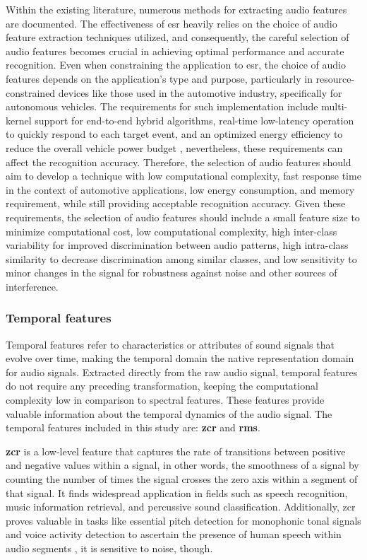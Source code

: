 Within the existing literature, numerous methods for extracting audio features are documented. The effectiveness of \gls{esr} heavily relies on the choice of audio feature extraction techniques utilized, and consequently, the careful selection of audio features becomes crucial in achieving optimal performance and accurate recognition. Even when constraining the application to \gls{esr}, the choice of audio features depends on the application’s type and purpose, particularly in resource-constrained devices like those used in the automotive industry, specifically for autonomous vehicles. The requirements for such implementation include multi-kernel support for end-to-end hybrid algorithms, real-time low-latency operation to quickly respond to each target event, and an optimized energy efficiency to reduce the overall vehicle power budget \cite{Yin2023}, nevertheless, these requirements can affect the recognition accuracy. Therefore, the selection of audio features should aim to develop a technique with low computational complexity, fast response time in the context of automotive applications, low energy consumption, and memory requirement, while still providing acceptable recognition accuracy. Given these requirements, the selection of audio features should include a small feature size to minimize computational cost, low computational complexity, high inter-class variability for improved discrimination between audio patterns, high intra-class similarity to decrease discrimination among similar classes, and low sensitivity to minor changes in the signal for robustness against noise and other sources of interference.


\subsubsection{Temporal features}
\label{subsubsec:audio_features_temporal}

Temporal features refer to characteristics or attributes of sound signals that evolve over time, making the temporal domain the native representation domain for audio signals. Extracted directly from the raw audio signal, temporal features do not require any preceding transformation, keeping the computational complexity low in comparison to spectral features. These features provide valuable information about the temporal dynamics of the audio signal. The temporal features included in this study are: \textbf{\gls{zcr}} and \textbf{\gls{rms}}.

\textbf{\gls{zcr}} is a low-level feature that captures the rate of transitions between positive and negative values within a signal, in other words,  the smoothness of a signal by counting the number of times the signal crosses the zero axis within a segment of that signal. It finds widespread application in fields such as speech recognition, music information retrieval, and percussive sound classification. Additionally, \gls{zcr} proves valuable in tasks like essential pitch detection for monophonic tonal signals and voice activity detection to ascertain the presence of human speech within audio segments \cite{Park2008}, it is sensitive to noise, though. 

